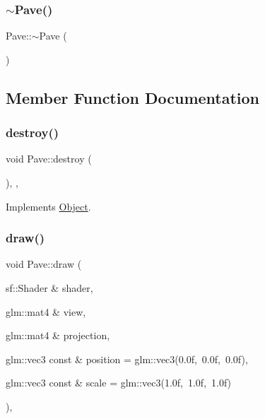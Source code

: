 \mbox{\label{classPave_ab171241ed7514bb59f563212b9844d6c}} 
\subsubsection{\texorpdfstring{$\sim$\+Pave()}{~Pave()}}
{\footnotesize\ttfamily Pave\+::$\sim$\+Pave (\begin{DoxyParamCaption}{ }\end{DoxyParamCaption})\hspace{0.3cm}{\ttfamily [override]}}



\subsection{Member Function Documentation}
\mbox{\label{classPave_a1600213efbebd71a3612bb6812ac463b}} 
\subsubsection{\texorpdfstring{destroy()}{destroy()}}
{\footnotesize\ttfamily void Pave\+::destroy (\begin{DoxyParamCaption}{ }\end{DoxyParamCaption})\hspace{0.3cm}{\ttfamily [override]}, {\ttfamily [protected]}, {\ttfamily [virtual]}}



Implements \hyperlink{classObject_a69e91bef2c9f048aa4509329dc44948e}{Object}.

\mbox{\label{classPave_a4dc3714e64f470c05726b7c7200d21e0}} 
\subsubsection{\texorpdfstring{draw()}{draw()}}
{\footnotesize\ttfamily void Pave\+::draw (\begin{DoxyParamCaption}\item[{sf\+::\+Shader \&}]{shader,  }\item[{glm\+::mat4 \&}]{view,  }\item[{glm\+::mat4 \&}]{projection,  }\item[{glm\+::vec3 const \&}]{position = {\ttfamily glm\+:\+:vec3(0.0f,~0.0f,~0.0f)},  }\item[{glm\+::vec3 const \&}]{scale = {\ttfamily glm\+:\+:vec3(1.0f,~1.0f,~1.0f)} }\end{DoxyParamCaption})\hspace{0.3cm}{\ttfamily [override]}, {\ttfamily [virtual]}}



